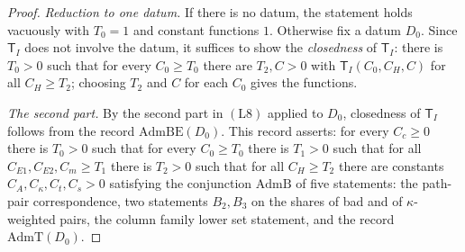 \begin{proof}
\emph{Reduction to one datum.} If there is no datum, the statement holds vacuously with $T_0=1$ and constant functions $1$.
Otherwise fix a datum $D_0$. Since $\mathsf T_I$ does not involve the datum, it suffices to show the \emph{closedness} of
$\mathsf T_I$: there is $T_0>0$ such that for every $C_0\ge T_0$ there are $T_2,C>0$ with $\mathsf T_I(C_0,C_H,C)$ for all
$C_H\ge T_2$; choosing $T_2$ and $C$ for each $C_0$ gives the functions.

\emph{The second part.} By the second part in $(\mathrm L8)$ applied to $D_0$, closedness of $\mathsf T_I$ follows from the
record $\mathrm{AdmBE}(D_0)$. This record asserts: for every $C_c\ge0$ there is $T_0>0$ such that for every $C_0\ge T_0$
there is $T_1>0$ such that for all $C_{E1},C_{E2},C_m\ge T_1$ there is $T_2>0$ such that for all $C_H\ge T_2$ there are
constants $C_A,C_\kappa,C_t,C_s>0$ satisfying the conjunction $\mathrm{AdmB}$ of five statements: the path-pair
correspondence, two statements $B_2,B_3$ on the shares of bad and of $\kappa$-weighted pairs, the column family lower set
statement, and the record $\mathrm{AdmT}(D_0)$.


\end{proof}
